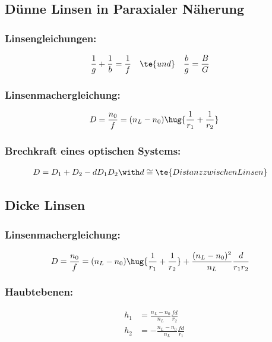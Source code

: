 \documentclass[twocolumn, unnumberedsubsub]{summery}
\begin{document}
\subsection{Dünne Linsen in Paraxialer Näherung}

\subsubsection*{Linsengleichungen:}\tight
    \begin{align*}
        \frac 1g + \frac 1b &= \frac 1f&&\te{und}&
        \frac{b}{g} &= \frac BG   
    \end{align*}


\subsubsection*{Linsenmachergleichung:}\tight
\begin{align*}
    D = \frac {n_0}f = (n_L - n_0)\hug{\frac 1{r_1} + \frac 1{r_2}}
\end{align*}

\subsubsection*{Brechkraft eines optischen Systems:}\tight
\begin{align*}
    D &= D_1 + D_2 - d D_1 D_2\with d\cong \te{Distanz zwischen Linsen}
\end{align*}

\subsection{Dicke Linsen}
\subsubsection*{Linsenmachergleichung:}\tight
\begin{align*}
    D = \frac {n_0}f &= (n_L - n_0)\hug{\frac 1{r_1} + \frac 1{r_2}}
    + \frac{(n_L - n_0)^2}{n_L}\frac{d}{r_1r_2}
\end{align*}

\subsubsection*{Haubtebenen:}
\tight
\begin{align*}
    h_1 &= \frac{n_L - n_0}{n_L} \frac{f d}{r_2}\\
    h_2 &= -\frac{n_L - n_0}{n_L} \frac{f d}{r_1}
\end{align*}
\end{document}
